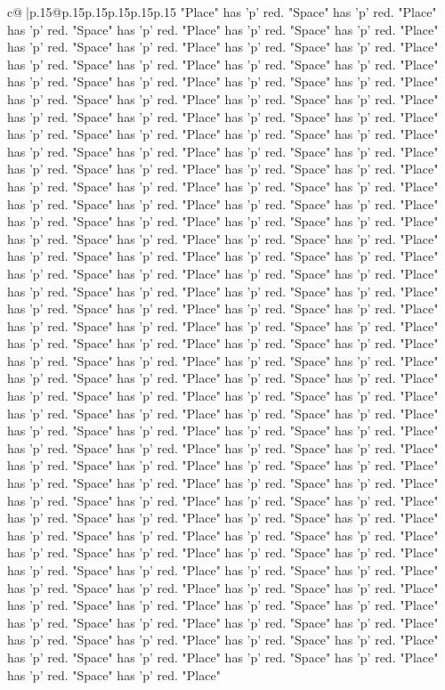 \documentclass{article}
\begin{document}
{\begin{supertabular}{c@{$\;$}|p{.15\linewidth}@{}p{.15\linewidth}p{.15\linewidth}p{.15\linewidth}p{.15\linewidth}p{.15\linewidth}}
{{{"Place" has 'p' red. "Space" has 'p' red. "Place" has 'p' red. "Space" has 'p' red. "Place" has 'p' red. "Space" has 'p' red. "Place" has 'p' red. "Space" has 'p' red. "Place" has 'p' red. "Space" has 'p' red. "Place" has 'p' red. "Space" has 'p' red. "Place" has 'p' red. "Space" has 'p' red. "Place" has 'p' red. "Space" has 'p' red. "Place" has 'p' red. "Space" has 'p' red. "Place" has 'p' red. "Space" has 'p' red. "Place" has 'p' red. "Space" has 'p' red. "Place" has 'p' red. "Space" has 'p' red. "Place" has 'p' red. "Space" has 'p' red. "Place" has 'p' red. "Space" has 'p' red. "Place" has 'p' red. "Space" has 'p' red. "Place" has 'p' red. "Space" has 'p' red. "Place" has 'p' red. "Space" has 'p' red. "Place" has 'p' red. "Space" has 'p' red. "Place" has 'p' red. "Space" has 'p' red. "Place" has 'p' red. "Space" has 'p' red. "Place" has 'p' red. "Space" has 'p' red. "Place" has 'p' red. "Space" has 'p' red. "Place" has 'p' red. "Space" has 'p' red. "Place" has 'p' red. "Space" has 'p' red. "Place" has 'p' red. "Space" has 'p' red. "Place" has 'p' red. "Space" has 'p' red. "Place" has 'p' red. "Space" has 'p' red. "Place" has 'p' red. "Space" has 'p' red. "Place" has 'p' red. "Space" has 'p' red. "Place" has 'p' red. "Space" has 'p' red. "Place" has 'p' red. "Space" has 'p' red. "Place" has 'p' red. "Space" has 'p' red. "Place" has 'p' red. "Space" has 'p' red. "Place" has 'p' red. "Space" has 'p' red. "Place" has 'p' red. "Space" has 'p' red. "Place" has 'p' red. "Space" has 'p' red. "Place" has 'p' red. "Space" has 'p' red. "Place" has 'p' red. "Space" has 'p' red. "Place" has 'p' red. "Space" has 'p' red. "Place" has 'p' red. "Space" has 'p' red. "Place" has 'p' red. "Space" has 'p' red. "Place" has 'p' red. "Space" has 'p' red. "Place" has 'p' red. "Space" has 'p' red. "Place" has 'p' red. "Space" has 'p' red. "Place" has 'p' red. "Space" has 'p' red. "Place" has 'p' red. "Space" has 'p' red. "Place" has 'p' red. "Space" has 'p' red. "Place" has 'p' red. "Space" has 'p' red. "Place" has 'p' red. "Space" has 'p' red. "Place" has 'p' red. "Space" has 'p' red. "Place" has 'p' red. "Space" has 'p' red. "Place" has 'p' red. "Space" has 'p' red. "Place" has 'p' red. "Space" has 'p' red. "Place" has 'p' red. "Space" has 'p' red. "Place" has 'p' red. "Space" has 'p' red. "Place" has 'p' red. "Space" has 'p' red. "Place" has 'p' red. "Space" has 'p' red. "Place" has 'p' red. "Space" has 'p' red. "Place" has 'p' red. "Space" has 'p' red. "Place" has 'p' red. "Space" has 'p' red. "Place" has 'p' red. "Space" has 'p' red. "Place" has 'p' red. "Space" has 'p' red. "Place" has 'p' red. "Space" has 'p' red. "Place" has 'p' red. "Space" has 'p' red. "Place" has 'p' red. "Space" has 'p' red. "Place" has 'p' red. "Space" has 'p' red. "Place" has 'p' red. "Space" has 'p' red. "Place" has 'p' red. "Space" has 'p' red. "Place" has 'p' red. "Space" has 'p' red. "Place" has 'p' red. "Space" has 'p' red. "Place" has 'p' red. "Space" has 'p' red. "Place" has 'p' red. "Space" has 'p' red. "Place" has 'p' red. "Space" has 'p' red. "Place" has 'p' red. "Space" has 'p' red. "Place" has 'p' red. "Space" has 'p' red. "Place" has 'p' red. "Space" has 'p' red. "Place" }}}
\end{supertabular}}
\end{document}
